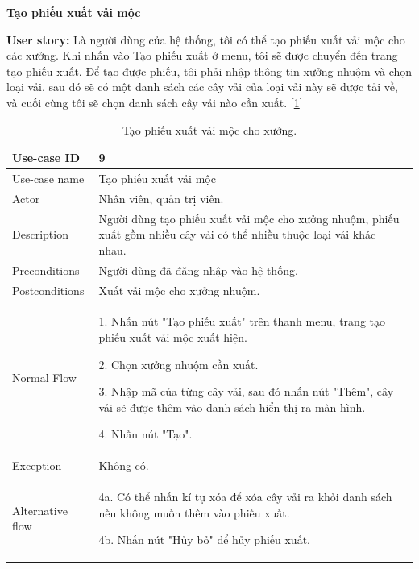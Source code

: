 \textbf{Tạo phiếu xuất vải mộc}\par
\textbf{User story:} Là người dùng của hệ thống, tôi có thể tạo phiếu xuất vải mộc cho các xưởng. Khi nhấn vào Tạo phiếu xuất ở menu, tôi sẽ được chuyển đến trang tạo phiếu xuất. Để tạo được phiếu, tôi phải nhập thông tin xưởng nhuộm và chọn loại vải, sau đó sẽ có một danh sách các cây vải của loại vải này sẽ được tải về, và cuối cùng tôi sẽ chọn danh sách cây vải nào cần xuất. [\ref{bang9}]
\begin{table}[!htp]
    \centering
    \begin{tabular}{|m{3cm}|m{10cm}|}
    \hline 
        Use-case ID & 9\\ \hline
        Use-case name & Tạo phiếu xuất vải mộc\\ \hline
        Actor & Nhân viên, quản trị viên.\\ \hline
        Description & Người dùng tạo phiếu xuất vải mộc cho xưởng nhuộm, phiếu xuất gồm nhiều cây vải có thể nhiều thuộc loại vải khác nhau.\\ \hline
        Preconditions & Người dùng đã đăng nhập vào hệ thống.
        \\ \hline
        Postconditions & Xuất vải mộc cho xưởng nhuộm.\\ \hline
        Normal Flow & 
        1. Nhấn nút "Tạo phiếu xuất" trên thanh menu, trang tạo phiếu xuất vải mộc xuất hiện.\par
        2. Chọn xưởng nhuộm cần xuất.\par
        3. Nhập mã của từng cây vải, sau đó nhấn nút "Thêm", cây vải sẽ được thêm vào danh sách hiển thị ra màn hình.\par
        4. Nhấn nút "Tạo".
        \\ \hline
        Exception & Không có.
        \\ \hline
        Alternative flow & 
        4a. Có thể nhấn kí tự xóa để xóa cây vải ra khỏi danh sách nếu không muốn thêm vào phiếu xuất.\par
        4b. Nhấn nút "Hủy bỏ" để hủy phiếu xuất.
        \\ 
    \hline 
    \end{tabular}
    \caption{Tạo phiếu xuất vải mộc cho xưởng.}
    \label{bang9}
\end{table}

